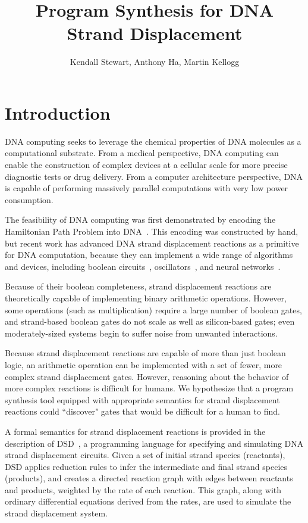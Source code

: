 \documentclass{article}
\begin{document}
\title{Program Synthesis for DNA Strand Displacement}
\author{Kendall Stewart, Anthony Ha, Martin Kellogg}

\maketitle

\section{Introduction}

DNA computing seeks to leverage the chemical properties
of DNA molecules as a computational substrate.
From a medical perspective, DNA computing can enable the
construction of complex devices at a cellular scale for more precise
diagnostic tests or drug delivery. From a computer architecture perspective,
DNA is capable of performing massively parallel computations with very low
power consumption.

The feasibility of DNA computing was first demonstrated by encoding the
Hamiltonian Path Problem into DNA~\cite{adelman}. This encoding was constructed
by hand, but recent work has advanced DNA strand displacement reactions as a
primitive for DNA computation, because they can implement a wide
range of algorithms and devices, including boolean circuits~\cite{strands},
oscillators~\cite{dsd}, and neural networks~\cite{strandnn}.

Because of their boolean completeness, strand displacement reactions are
theoretically capable of implementing binary arithmetic operations. However,
some operations (such as multiplication) require a large number of
boolean gates, and strand-based boolean gates do not scale as well as
silicon-based gates; even moderately-sized systems begin to suffer noise
from unwanted interactions.

Because strand displacement reactions are capable of more than just boolean
logic, an arithmetic operation can be implemented with a set of
fewer, more complex strand displacement gates. However, reasoning about the
behavior of more complex reactions is difficult for humans. We hypothesize that
a program synthesis tool equipped with appropriate semantics for strand
displacement reactions could ``discover" gates that would be difficult for a
human to find.

A formal semantics for strand displacement reactions is provided in the
description of DSD~\cite{dsd}, a programming language for specifying and
simulating DNA strand displacement circuits. Given a set of initial strand
species (reactants), DSD applies reduction rules to infer the intermediate and
final strand species (products), and creates a directed reaction graph with
edges between reactants and products, weighted by the rate of each reaction.
This graph, along with ordinary differential equations derived from the rates,
are used to simulate the strand displacement system.
\end{document}
